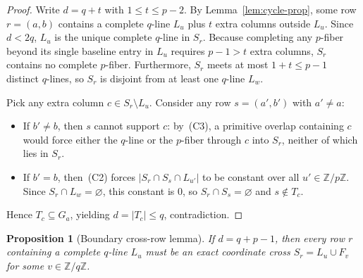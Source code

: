 \documentclass[11pt,reqno]{amsart}
\numberwithin{equation}{section}
\newtheorem{proposition}[theorem]{Proposition}
\theoremstyle{definition}
\theoremstyle{remark}
\newcommand{\Z}{\mathbb{Z}}
\begin{document}
\begin{proof}
Write $d=q+t$ with $1\le t\le p-2$. By Lemma~\ref{lem:cycle-prop}, some row $r=(a,b)$ contains a complete $q$-line $L_u$ plus $t$ extra columns outside $L_u$. Since $d<2q$, $L_u$ is the unique complete $q$-line in $S_r$. Because completing any $p$-fiber beyond its single baseline entry in $L_u$ requires $p-1>t$ extra columns, $S_r$ contains no complete $p$-fiber. Furthermore, $S_r$ meets at most $1+t\le p-1$ distinct $q$-lines, so $S_r$ is disjoint from at least one $q$-line $L_w$.

Pick any extra column $c\in S_r\setminus L_u$. Consider any row $s=(a',b')$ with $a'\neq a$:
\begin{itemize}[leftmargin=1.5em]
\item If $b'\neq b$, then $s$ cannot support $c$: by~(C3), a primitive overlap containing $c$ would force either the $q$-line or the $p$-fiber through $c$ into $S_r$, neither of which lies in $S_r$.
\item If $b'=b$, then~(C2) forces $|S_r\cap S_s\cap L_{u'}|$ to be constant over all $u'\in\Z/p\Z$. Since $S_r\cap L_w=\varnothing$, this constant is $0$, so $S_r\cap S_s=\varnothing$ and $s\notin T_c$.
\end{itemize}
Hence $T_c\subseteq G_a$, yielding $d=|T_c|\le q$, contradiction.
\end{proof}

\begin{proposition}[Boundary cross-row lemma]
\label{prop:cross}
If $d=q+p-1$, then every row $r$ containing a complete $q$-line $L_u$ must be an exact coordinate cross $S_r = L_u\cup F_v$ for some $v\in\Z/q\Z$.
\end{proposition}
\end{document}

